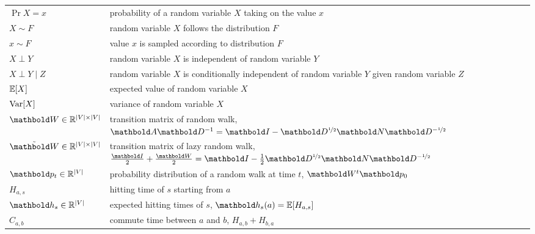 \begin{fullwidth}
\vspace{0.5cm}\section*{}\vspace{-0.5cm}
\begin{longtable}{p{2.5cm}l}
   $\Pr{X = x}$ & probability of a random variable $X$ taking on the value $x$ \\
   $X \sim F$ & random variable $X$ follows the distribution $F$ \\
   $x \sim F$ & value $x$ is sampled according to distribution $F$ \\
  $X \perp Y$ & random variable $X$ is independent of random variable $Y$ \\
  $X \perp Y \mid Z$ & \makecell[tl]{random variable $X$ is conditionally independent of random variable $Y$ \\ given random variable $Z$} \\
   $\E{X}$ & expected value of random variable $X$ \\
  $\Var{X}$ & variance of random variable $X$ \\
    \addlinespace
   $\mW \in \R^{|\sV|\times|\sV|}$ & transition matrix of random walk, $\mA\inv{\mD} = \mI - \mD^{\nicefrac{1}{2}}\mN\mD^{-\nicefrac{1}{2}}$ \\
   $\Tilde{\mW} \in \R^{|\sV|\times|\sV|}$ & transition matrix of lazy random walk, $\frac{\mI}{2} + \frac{\mW}{2} = \mI - \frac{1}{2}\mD^{\nicefrac{1}{2}}\mN\mD^{-\nicefrac{1}{2}}$ \\
   $\vp_t \in \R^{|\sV|}$ & probability distribution of a random walk at time $t$, $\mW^t\vp_0$ \\
   $H_{a,s}$ & hitting time of $s$ starting from $a$ \\
   $\vh_s \in \R^{|\sV|}$ & expected hitting times of $s$, $\vh_s(a) = \E{H_{a,s}}$ \\
   $C_{a,b}$ & commute time between $a$ and $b$, $H_{a,b} + H_{b,a}$ \\
\end{longtable}


\end{fullwidth}
